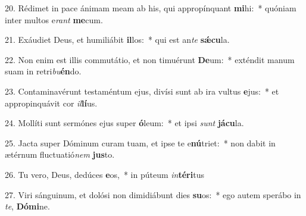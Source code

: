 20. Rédimet in pace ánimam meam ab his, qui appropínquant \textbf{mi}hi:~*  quóniam inter multos e\textit{rant} \textbf{me}cum.\

21. Exáudiet Deus, et humiliábit \textbf{il}los:~*  qui est an\textit{te} \textbf{sǽ}\textbf{cu}la.\

22. Non enim est illis commutátio, et non timuérunt \textbf{De}um:~*  exténdit manum suam in retri\textit{bu}\textbf{én}do.\

23. Contaminavérunt testaméntum ejus, divísi sunt ab ira vultus \textbf{e}jus:~*  et appropinquávit cor \textit{il}\textbf{lí}us.\

24. Mollíti sunt sermónes ejus super \textbf{ó}leum:~*  et ipsi \textit{sunt} \textbf{já}\textbf{cu}la.\

25. Jacta super Dóminum curam tuam, et ipse te e\textbf{nú}triet:~*  non dabit in ætérnum fluctuatió\textit{nem} \textbf{jus}to.\

26. Tu vero, Deus, dedúces \textbf{e}os,~*  in púteum \textit{in}\textbf{tér}\textbf{i}tus\

27. Viri sánguinum, et dolósi non dimidiábunt dies \textbf{su}os:~*  ego autem sperábo in \textit{te}, \textbf{Dó}\textbf{mi}ne.\

